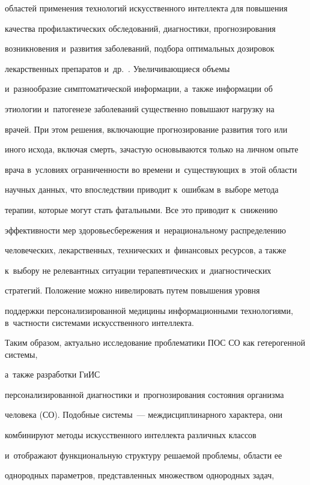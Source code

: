 областей применения технологий искусственного интеллекта для повышения 

качества профилактических обследований, диагностики, прогнозирования 

возникновения и~развития заболеваний, подбора оптимальных дозировок 

лекарственных препаратов и~др.~\cite{1-rum}. Увеличивающиеся объемы 

и~разнообразие симптоматической информации, а~также информации об 

этиологии и~патогенезе заболеваний существенно повышают нагрузку на 

врачей. При этом решения, вклю\-ча\-ющие прогнозирование развития того или 

иного исхода, включая смерть, зачастую основываются только на личном опыте 

врача в~условиях ограниченности во времени и~существующих в~этой области 

научных данных, что впоследствии приводит к~ошибкам в~выборе метода 

терапии, которые могут стать фатальными. Все это приводит к~снижению 

эффективности мер здоровьесбережения и~нерациональному распределению 

человеческих, лекарственных, технических и~финансовых ресурсов, а также 

к~выбору не релевантных ситуации терапевтических и~диагностических 

стратегий. Положение можно нивелировать путем повышения уровня 

поддержки персонализированной медицины информационными технологиями, в~частности системами искусственного интеллекта. 

  

  Таким образом, актуально исследование проблематики ПОС СО как гетерогенной системы, 

а~также разработки ГиИС 

персонализированной диагностики и~прогнозирования состояния организма 

человека (СО). Подобные системы~--- междисциплинарного характера, они 

комбинируют методы искусственного интеллекта различных классов 

и~отображают функциональную структуру ре\-ша\-емой проблемы, области ее 

однородных параметров, представленных множеством однородных задач, 

